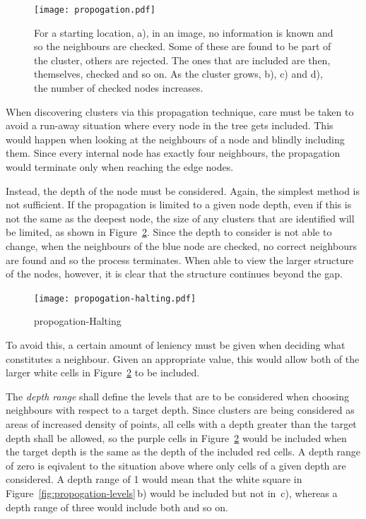 \begin{figure}[tbhp]
	\centering
	\texttt{[image: propogation.pdf]}
	\caption{For a starting location, a), in an image, no information is known
	and so the neighbours are checked. Some of these are found to be part of
	the cluster, others are rejected. The ones that are included are then,
	themselves, checked and so on. As the cluster grows, b), c) and d), the
	number of checked nodes increases.}
	\label{fig:propogation}
\end{figure}

When discovering clusters via this propagation technique, care must be taken to
avoid a run-away situation where every node in the tree gets included. This
would happen when looking at the neighbours of a node and blindly including
them. Since every internal node has exactly four neighbours, the propagation
would terminate only when reaching the edge nodes.

Instead, the depth of the node must be considered. Again, the simplest method
is not sufficient. If the propagation is limited to a given node depth, even if
this is not the same as the deepest node, the size of any clusters that are
identified will be limited, as shown in Figure~\ref{fig:propogation-halting}.
Since the depth to consider is not able to change, when the neighbours of the
blue node are checked, no correct neighbours are found and so the process
terminates. When able to view the larger structure of the nodes, however, it is
clear that the structure continues beyond the gap.

\begin{figure}[tbhp]
	\centering
	\texttt{[image: propogation-halting.pdf]}
	\caption{propogation-Halting}
	\label{fig:propogation-halting}
\end{figure}

To avoid this, a certain amount of leniency must be given when deciding what
constitutes a neighbour. Given an appropriate value, this would allow both of
the larger white cells in Figure~\ref{fig:propogation-halting} to be included.

The \emph{depth range} shall define the levels that are to be considered when
choosing neighbours with respect to a target depth. Since clusters are being
considered as areas of increased density of points, all cells with a depth
greater than the target depth shall be allowed, so the purple cells in
Figure~\ref{fig:propogation-halting} would be included when the target depth is
the same as the depth of the included red cells. A depth range of zero is
eqivalent to the situation above where only cells of a given depth are
considered. A depth range of 1 would mean that the white square in
Figure~\ref{fig:propogation-levels}\,b) would be included but not in~c),
whereas a depth range of three would include both and so on.

